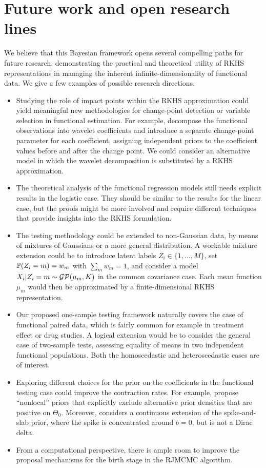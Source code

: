 \section{Future work and open research lines}

We believe that this Bayesian framework opens several compelling paths for future research, demonstrating the practical and theoretical utility of \acs{RKHS} representations in managing the inherent infinite-dimensionality of functional data. We give a few examples of possible research directions.

\begin{itemize}
    \item Studying the role of impact points within the \acs{RKHS} approximation could yield meaningful new methodologies for change-point detection or variable selection in functional estimation. For example, \citet{li2021bayesian} decompose the functional observations into wavelet coefficients and introduce a separate change-point parameter for each coefficient, assigning independent priors to the coefficient values before and after the change point. We could consider an alternative model in which the wavelet decomposition is substituted by a \acs{RKHS} approximation.
    \item The theoretical analysis of the functional regression models still needs explicit results in the logistic case. They should be similar to the results for the linear case, but the proofs might be more involved and require different techniques that provide insights into the \acs{RKHS} formulation.
    \item The testing methodology could be extended to non-Gaussian data, by means of mixtures of Gaussians or a more general distribution. A workable mixture extension could be to introduce latent labels \(Z_i\in \{1,\dots,M\}\), set \(\mathbb{P}(Z_i=m)=w_m\) with \(\sum_m w_m=1\), and consider a model \(X_i|Z_i=m \sim \operatorname{\mathcal{GP}}(\mu_m, K)\) in the common covariance case. Each mean function \(\mu_m\) would then be approximated by a finite-dimensional \acs{RKHS} representation.
    \item Our proposed one-sample testing framework naturally covers the case of functional paired data, which is fairly common for example in treatment effect or drug studies. A logical extension would be to consider the general case of two-sample tests, assessing equality of means in two independent functional populations. Both the homoscedastic and heteroscedastic cases are of interest.
    \item Exploring different choices for the prior on the coefficients in the functional testing case could improve the contraction rates. For example, \citet{johnson2010use} propose ``nonlocal'' priors that explicitly exclude alternative prior densities that are positive on \(\Theta_0\). Moreover, \citet{rockova2018bayesian} considers a continuous extension of the spike-and-slab prior, where the spike is concentrated around \(b=0\), but is not a Dirac delta.
    \item From a computational perspective, there is ample room to improve the proposal mechanisms for the birth stage in the \acs{RJMCMC} algorithm.
\end{itemize}


